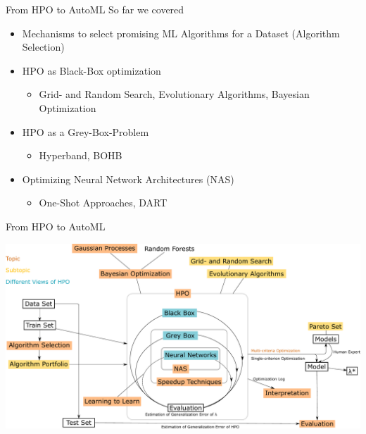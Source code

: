 
\subtitle{Wrap Up}




\maketitle



\begin{frame}{From HPO to AutoML}
  So far we covered
  \begin{itemize}
    \item Mechanisms to select promising ML Algorithms for a Dataset (Algorithm Selection)
    \item HPO as Black-Box optimization
    \begin{itemize}
      \item Grid- and Random Search, Evolutionary Algorithms, Bayesian Optimization
    \end{itemize}
    \item HPO as a Grey-Box-Problem
    \begin{itemize}
      \item Hyperband, BOHB
    \end{itemize}
    \item Optimizing Neural Network Architectures (NAS)
    \begin{itemize}
      \item One-Shot Approaches, DART
    \end{itemize}
  \end{itemize}  
\end{frame}

\begin{frame}{From HPO to AutoML}
    \begin{center}
      \includegraphics[width = 0.9\linewidth]{images/drawing.pdf}  
    \end{center}
\end{frame}

